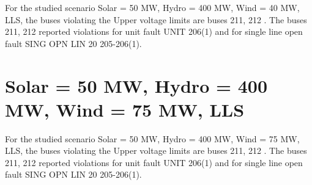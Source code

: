 \documentclass[10pt]{report}
\begin{document}
For the studied scenario Solar = 50 MW, Hydro = 400 MW, Wind = 40 MW, LLS, the buses violating the Upper voltage limits are buses 211, 212 .
The buses 211, 212 reported violations for unit fault UNIT 206(1) and for single line open fault SING OPN LIN   20 205-206(1).
\begin{table}[H]
\caption{Contingencies reporting bus voltages greater than emergency voltage of 1.1 PU for scenario Solar = 50 MW, Hydro = 400 MW, Wind = 40 MW, LLS}
\label{HVSolar50MWHydro400MWWind40MWLLS}
\centering
{}
\end{table}

\section{Solar = 50 MW, Hydro = 400 MW, Wind = 75 MW, LLS}

For the studied scenario Solar = 50 MW, Hydro = 400 MW, Wind = 75 MW, LLS, the buses violating the Upper voltage limits are buses 211, 212 .
The buses 211, 212 reported violations for unit fault UNIT 206(1) and for single line open fault SING OPN LIN   20 205-206(1).
\begin{table}[H]
\caption{Contingencies reporting bus voltages greater than emergency voltage of 1.1 PU for scenario Solar = 50 MW, Hydro = 400 MW, Wind = 75 MW, LLS}
\label{HVSolar50MWHydro400MWWind75MWLLS}
\centering
{}
\end{table}
\end{document}
